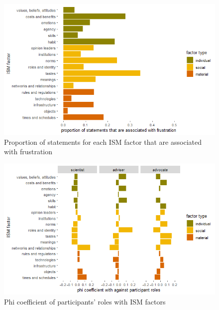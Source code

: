 \begin{figure}[!ht]
    \centering
    \includegraphics[width=1\linewidth]{figures/statements_associated_with_frustration.png}
    \caption{Proportion of statements for each ISM factor that are associated with frustration}
    \label{fig:ismfrustration}
\end{figure}

\begin{figure}[!ht]
    \centering
    \includegraphics[width=1\linewidth]{figures/phi_coefficient_with_roles.png}
    \caption{Phi coefficient of participants' roles with ISM factors}
    \label{fig:ismparticipantcount}
\end{figure}


